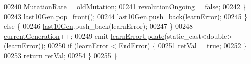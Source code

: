 \begin{DoxyCode}
00240       \hyperlink{class_soil_math_1_1_g_a_a82996d544a2f25b5a75ae8ba1e82d661}{MutationRate} = \hyperlink{class_soil_math_1_1_g_a_a437db38d6fdb7953a5d83f120b020130}{oldMutation};
00241       \hyperlink{class_soil_math_1_1_g_a_a8883b6114388bb8a992b7f057ec565a8}{revolutionOngoing} = \textcolor{keyword}{false};
00242     \}
00243     \hyperlink{class_soil_math_1_1_g_a_a1e78adf31886d887ae192537e68aa236}{last10Gen}.pop\_front();
00244     \hyperlink{class_soil_math_1_1_g_a_a1e78adf31886d887ae192537e68aa236}{last10Gen}.push\_back(learnError);
00245   \} \textcolor{keywordflow}{else} \{
00246     \hyperlink{class_soil_math_1_1_g_a_a1e78adf31886d887ae192537e68aa236}{last10Gen}.push\_back(learnError);
00247   \}
00248   \hyperlink{class_soil_math_1_1_g_a_ad1d08c52d5160714a997bcd30de028e3}{currentGeneration}++;
00249   emit \hyperlink{class_soil_math_1_1_g_a_a3b7d8649411ccebc8cb6f44ed1ba2365}{learnErrorUpdate}(static\_cast<double>(learnError));
00250   \textcolor{keywordflow}{if} (learnError < \hyperlink{class_soil_math_1_1_g_a_ad5d1226dba5df72a3419e9af62f4e9d9}{EndError}) \{
00251     retVal = \textcolor{keyword}{true};
00252   \}
00253   \textcolor{keywordflow}{return} retVal;
00254 \}
00255 \}
\end{DoxyCode}

